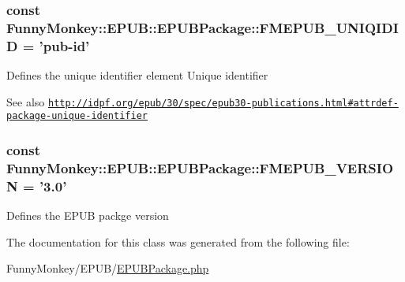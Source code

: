 \hypertarget{classFunnyMonkey_1_1EPUB_1_1EPUBPackage_a04ae6219877affddb66faf9c97bd5777}{
\subsubsection[{FMEPUB\_\-UNIQIDID}]{\setlength{\rightskip}{0pt plus 5cm}const {\bf FunnyMonkey::EPUB::EPUBPackage::FMEPUB\_\-UNIQIDID} = 'pub-\/id'}}
\label{classFunnyMonkey_1_1EPUB_1_1EPUBPackage_a04ae6219877affddb66faf9c97bd5777}
Defines the unique identifier element Unique identifier \begin{DoxySeeAlso}{See also}
\href{http://idpf.org/epub/30/spec/epub30-publications.html#attrdef-package-unique-identifier}{\tt http://idpf.org/epub/30/spec/epub30-\/publications.html\#attrdef-\/package-\/unique-\/identifier} 
\end{DoxySeeAlso}
\hypertarget{classFunnyMonkey_1_1EPUB_1_1EPUBPackage_aa54a86dd6eb3280a24747f46d42a9f1e}{
\subsubsection[{FMEPUB\_\-VERSION}]{\setlength{\rightskip}{0pt plus 5cm}const {\bf FunnyMonkey::EPUB::EPUBPackage::FMEPUB\_\-VERSION} = '3.0'}}
\label{classFunnyMonkey_1_1EPUB_1_1EPUBPackage_aa54a86dd6eb3280a24747f46d42a9f1e}
Defines the EPUB packge version 

The documentation for this class was generated from the following file:\begin{DoxyCompactItemize}
\item 
FunnyMonkey/EPUB/\hyperlink{EPUBPackage_8php}{EPUBPackage.php}\end{DoxyCompactItemize}
